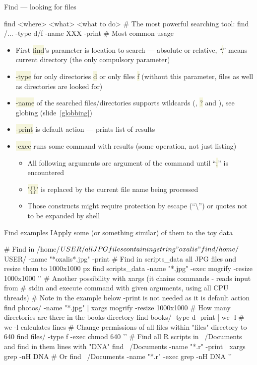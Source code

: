 \documentclass[compress, xelatex, 11pt, xcolor=svgnames, aspectratio=169,
	hyperref={
		bookmarks=true,
		unicode=true,
		colorlinks=true,
		pdftitle={Linux, command line and MetaCentrum},
		plainpages=false,
		pdfauthor={Vojtech Zeisek},
		pdfsubject={Course about use of Linux command line, writing shell scripts and using MetaCentrum of CESNET},
		pdfcreator={XeLaTeX},
		pdfkeywords={Linux, GNU, BASH, shell, command line, MetaCentrum},
		linkcolor=DarkRed, %
		anchorcolor=DarkBlue, %
		citecolor=Indigo, %
		filecolor=NavyBlue, %
		menucolor=DarkMagenta, %
		urlcolor=DarkBlue, %
		},
	url={hyphens, lowtilde} %
	]{beamer}
\renewcommand{\texttt}[1]{\colorbox{Beige}{{\ttfamily #1}}}
\begin{document}
\begin{frame}[fragile]{Find --- looking for files}
	\begin{bashcode}
    find <where> <what> <what to do> # The most powerful searching tool:
    find /... -type d/f -name XXX -print # Most common usage
	\end{bashcode}
	\begin{itemize}
		\item First \texttt{find}'s parameter is location to search --- absolute or relative, \enquote{\texttt{.}} means current directory (the only compulsory parameter)
		\item \texttt{-type} for only directories \texttt{d} or only files \texttt{f} (without this parameter, files as well as directories are looked for)
		\item \texttt{-name} of the searched files/directories supports wildcards (\texttt{*}, \texttt{?} and \texttt{[\ldots]}), see globing (slide~\ref{globbing})
		\item \texttt{-print} is default action --- prints list of results
		\item \texttt{-exec} runs some command with results (some operation, not just listing)
		\begin{itemize}
			\item All following arguments are argument of the command until \enquote{\texttt{;}} is encountered
			\item \texttt{'\{\}'} is replaced by the current file name being processed
			\item Those constructs might require protection by escape (\enquote{\textbackslash}) or quotes not to be expanded by shell
		\end{itemize}
	\end{itemize}
\end{frame}

\begin{frame}[fragile]{Find examples I}{Apply some (or something similar) of them to the toy data}
	\begin{bashcode}
    # Find in /home/$USER/ all JPG files containing string "oxalis"
    find /home/$USER/ -name "*oxalis*.jpg" -print
    # Find in scripts_data all JPG files and resize them to 1000x1000 px
    find scripts_data -name "*.jpg" -exec mogrify -resize 1000x1000 '{}' \;
    # Another possibility with xargs (it chains commands - reads input from
    # stdin and execute command with given arguments, using all CPU threads)
    # Note in the example below -print is not needed as it is default action
    find photos/ -name "*.jpg" | xargs mogrify -resize 1000x1000
    # How many directories are there in the books directory
    find books/ -type d -print | wc -l # wc -l calculates lines
    # Change permissions of all files within "files" directory to 640
    find files/ -type f -exec chmod 640 '{}' \;
    # Find all R scripts in ~/Documents and find in them lines with "DNA"
    find ~/Documents -name "*.r" -print | xargs grep -nH DNA # Or
    find ~/Documents -name "*.r" -exec grep -nH DNA '{}' \;
	\end{bashcode}
\end{frame}
\end{document}
